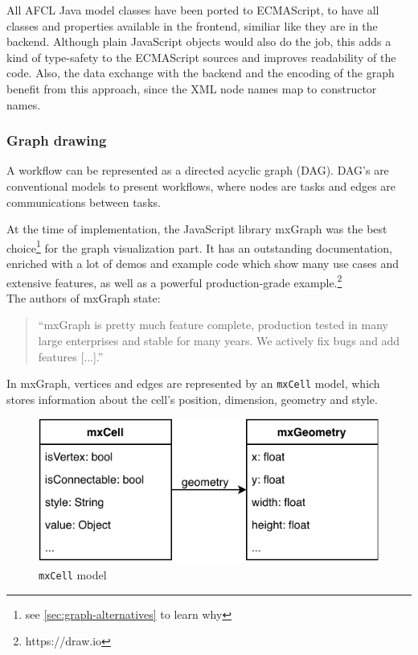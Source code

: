 \documentclass[a4paper,12pt,pdftex,halfparskip,cleardoubleempty,bibtotoc,liststotoc]{scrbook}
\begin{document}
All AFCL Java model classes have been ported to ECMAScript, to have all classes and properties available in the frontend, similiar like they are in the backend. Although plain JavaScript objects would also do the job, this adds a kind of type-safety to the ECMAScript sources and improves readability of the code. Also, the data exchange with the backend and the encoding of the graph benefit from this approach, since the XML node names map to constructor names.

\subsubsection{Graph drawing}

A workflow can be represented as a directed acyclic graph (DAG). DAG's are conventional models to present workflows, where nodes are tasks and edges are communications between tasks.

At the time of implementation, the JavaScript library mxGraph was the best choice\footnote{see \ref{sec:graph-alternatives} to learn why} for the graph visualization part.
It has an outstanding documentation, enriched with a lot of demos and example code which show many use cases and extensive features, as well as a powerful production-grade example.\footnote{https://draw.io}\\
The authors of mxGraph state:\\
\begin{quote}
``mxGraph is pretty much feature complete, production tested in many large enterprises and stable for many years. We actively fix bugs and add features [...].''
\end{quote}

In mxGraph, vertices and edges are represented by an \texttt{mxCell} model, which stores information about the cell's position, dimension, geometry and style.

\begin{figure}[H]
  \centering
  \vspace{0.8cm}
  \includegraphics[]{mxCell}
  \caption{\texttt{mxCell} model}
\end{figure}
\end{document}
